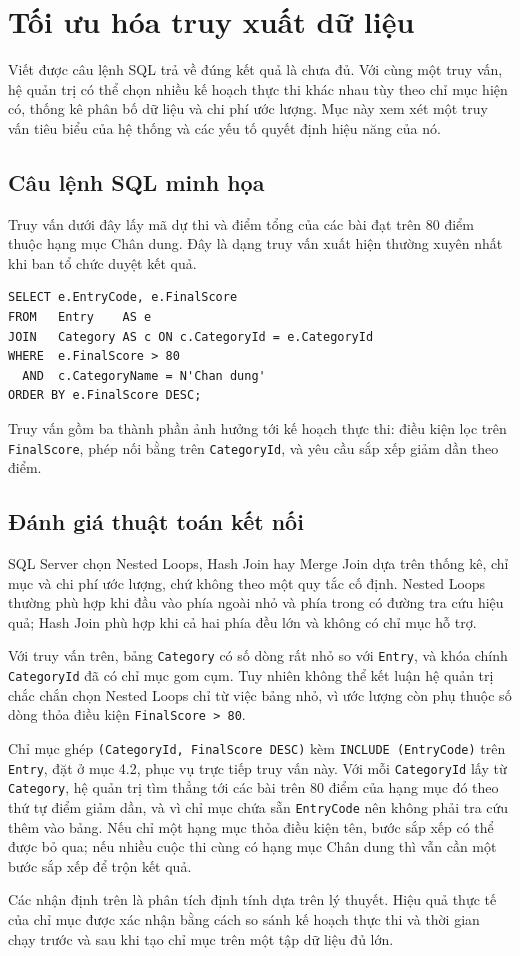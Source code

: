 \section{Tối ưu hóa truy xuất dữ liệu}

Viết được câu lệnh SQL trả về đúng kết quả là chưa đủ. Với cùng một truy vấn, hệ quản trị có thể chọn nhiều kế hoạch thực thi khác nhau tùy theo chỉ mục hiện có, thống kê phân bố dữ liệu và chi phí ước lượng. Mục này xem xét một truy vấn tiêu biểu của hệ thống và các yếu tố quyết định hiệu năng của nó.

\subsection{Câu lệnh SQL minh họa}

Truy vấn dưới đây lấy mã dự thi và điểm tổng của các bài đạt trên 80 điểm thuộc hạng mục Chân dung. Đây là dạng truy vấn xuất hiện thường xuyên nhất khi ban tổ chức duyệt kết quả.

\begin{lstlisting}[style=sqlstyle]
SELECT e.EntryCode, e.FinalScore
FROM   Entry    AS e
JOIN   Category AS c ON c.CategoryId = e.CategoryId
WHERE  e.FinalScore > 80
  AND  c.CategoryName = N'Chan dung'
ORDER BY e.FinalScore DESC;
\end{lstlisting}

Truy vấn gồm ba thành phần ảnh hưởng tới kế hoạch thực thi: điều kiện lọc trên \texttt{FinalScore}, phép nối bằng trên \texttt{CategoryId}, và yêu cầu sắp xếp giảm dần theo điểm.

\subsection{Đánh giá thuật toán kết nối}

SQL Server chọn Nested Loops, Hash Join hay Merge Join dựa trên thống kê, chỉ mục và chi phí ước lượng, chứ không theo một quy tắc cố định. Nested Loops thường phù hợp khi đầu vào phía ngoài nhỏ và phía trong có đường tra cứu hiệu quả; Hash Join phù hợp khi cả hai phía đều lớn và không có chỉ mục hỗ trợ.

Với truy vấn trên, bảng \texttt{Category} có số dòng rất nhỏ so với \texttt{Entry}, và khóa chính \texttt{CategoryId} đã có chỉ mục gom cụm. Tuy nhiên không thể kết luận hệ quản trị chắc chắn chọn Nested Loops chỉ từ việc bảng nhỏ, vì ước lượng còn phụ thuộc số dòng thỏa điều kiện \texttt{FinalScore > 80}.

Chỉ mục ghép \texttt{(CategoryId, FinalScore DESC)} kèm \texttt{INCLUDE (EntryCode)} trên \texttt{Entry}, đặt ở mục 4.2, phục vụ trực tiếp truy vấn này. Với mỗi \texttt{CategoryId} lấy từ \texttt{Category}, hệ quản trị tìm thẳng tới các bài trên 80 điểm của hạng mục đó theo thứ tự điểm giảm dần, và vì chỉ mục chứa sẵn \texttt{EntryCode} nên không phải tra cứu thêm vào bảng. Nếu chỉ một hạng mục thỏa điều kiện tên, bước sắp xếp có thể được bỏ qua; nếu nhiều cuộc thi cùng có hạng mục Chân dung thì vẫn cần một bước sắp xếp để trộn kết quả.

Các nhận định trên là phân tích định tính dựa trên lý thuyết. Hiệu quả thực tế của chỉ mục được xác nhận bằng cách so sánh kế hoạch thực thi và thời gian chạy trước và sau khi tạo chỉ mục trên một tập dữ liệu đủ lớn.
